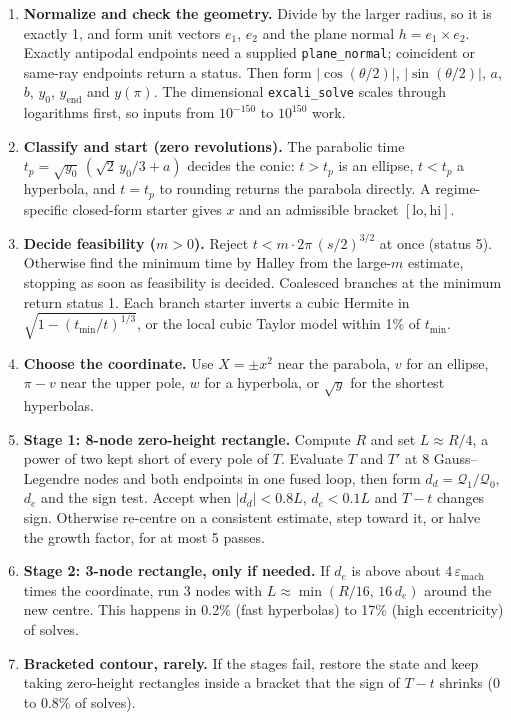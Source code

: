 \documentclass[11pt]{article}
\newcommand{\code}[1]{\texttt{#1}}
\newcommand{\Q}{\mathcal{Q}}
\begin{document}
\begin{enumerate}
  \item \textbf{Normalize and check the geometry.} Divide by the larger radius, so it is exactly 1, and form unit vectors $e_1$, $e_2$ and the plane normal $h = e_1\times e_2$. Exactly antipodal endpoints need a supplied \code{plane\_normal}; coincident or same-ray endpoints return a status. Then form $|\cos(\theta/2)|$, $|\sin(\theta/2)|$, $a$, $b$, $y_0$, $y_\text{end}$ and $y(\pi)$. The dimensional \code{excali\_solve} scales through logarithms first, so inputs from $10^{-150}$ to $10^{150}$ work.
  \item \textbf{Classify and start (zero revolutions).} The parabolic time $t_p = \sqrt{y_0}\,(\sqrt2\,y_0/3 + a)$ decides the conic: $t>t_p$ is an ellipse, $t<t_p$ a hyperbola, and $t=t_p$ to rounding returns the parabola directly. A regime-specific closed-form starter gives $x$ and an admissible bracket $[\text{lo},\text{hi}]$.
  \item \textbf{Decide feasibility ($m>0$).} Reject $t < m\cdot2\pi\,(s/2)^{3/2}$ at once (status 5). Otherwise find the minimum time by Halley from the large-$m$ estimate, stopping as soon as feasibility is decided. Coalesced branches at the minimum return status 1. Each branch starter inverts a cubic Hermite in $\sqrt{1-(t_\text{min}/t)^{1/3}}$, or the local cubic Taylor model within 1\% of $t_\text{min}$.
  \item \textbf{Choose the coordinate.} Use $X=\pm x^2$ near the parabola, $v$ for an ellipse, $\pi-v$ near the upper pole, $w$ for a hyperbola, or $\sqrt{y}$ for the shortest hyperbolas.
  \item \textbf{Stage 1: 8-node zero-height rectangle.} Compute $R$ and set $L\approx R/4$, a power of two kept short of every pole of $T$. Evaluate $T$ and $T'$ at 8 Gauss--Legendre nodes and both endpoints in one fused loop, then form $d_d = \Q_1/\Q_0$, $d_e$ and the sign test. Accept when $|d_d|<0.8L$, $d_e<0.1L$ and $T-t$ changes sign. Otherwise re-centre on a consistent estimate, step toward it, or halve the growth factor, for at most 5 passes.
  \item \textbf{Stage 2: 3-node rectangle, only if needed.} If $d_e$ is above about $4\,\varepsilon_\text{mach}$ times the coordinate, run 3 nodes with $L\approx\min(R/16,\,16\,d_e)$ around the new centre. This happens in 0.2\% (fast hyperbolas) to 17\% (high eccentricity) of solves.
  \item \textbf{Bracketed contour, rarely.} If the stages fail, restore the state and keep taking zero-height rectangles inside a bracket that the sign of $T-t$ shrinks (0 to 0.8\% of solves).

\end{enumerate}
\end{document}
